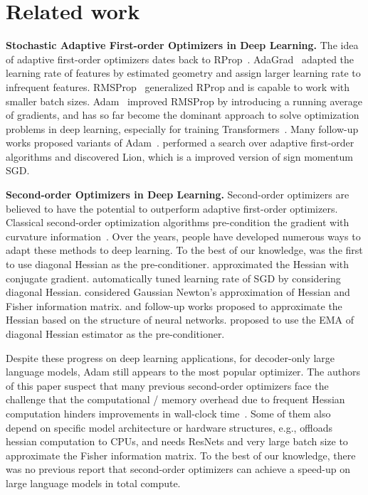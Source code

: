 \section{Related work} 
\label{sec:rw}
\textbf{Stochastic Adaptive First-order Optimizers in Deep Learning.} The idea of adaptive first-order optimizers dates back to RProp~\citep{braun1992rprop}. AdaGrad~\citep{duchi2011adaptive} adapted the learning rate of features by estimated geometry and assign larger learning rate to infrequent features. 
RMSProp~\citep{hinton2012neural} generalized RProp and is capable to work with smaller batch sizes. Adam~\citep{kingma2014Adam} improved RMSProp by introducing a running average of gradients, and has so far become the dominant approach to solve optimization problems in deep learning, especially for training Transformers~\citep{vaswani2017attention}. Many follow-up works proposed variants of Adam~\citep{dozat2016incorporating,shazeer2018adafactor,reddi2019convergence,loshchilov2017decoupled, zhuang2020adabelief, you2019large}. \citet{chen2023symbolic} performed a search over adaptive first-order algorithms and discovered Lion, which is a improved version of sign momentum SGD.


\textbf{Second-order Optimizers in Deep Learning.} Second-order optimizers are believed to have the potential to outperform adaptive first-order optimizers. Classical second-order optimization algorithms pre-condition the gradient with curvature information~\citep{broyden1970convergence,nesterov2006cubic,conn2000trust}. Over the years, people have developed numerous ways to adapt these methods to deep learning. To the best of our knowledge, \citet{becker1988improving} was the first to use diagonal Hessian as the pre-conditioner. \citet{martens2010deep} approximated the Hessian with conjugate gradient. \citet{schaul2013no} automatically tuned learning rate of SGD by considering diagonal Hessian. \citet{pascanu2013revisiting} considered Gaussian Newton's approximation of Hessian and Fisher information matrix. \citet{martens2015optimizing} and follow-up works \citep{ba2017distributed,george2018fast,martens2018kronecker,zhang2022eva} proposed to approximate the Hessian based on the structure of neural networks. \citet{yao2021adahessian, jahani2021doubly} proposed to use the EMA of diagonal Hessian estimator as the pre-conditioner. 

Despite these progress on deep learning applications, for decoder-only large language models, Adam still appears to the most popular optimizer. The authors of this paper suspect that many previous second-order optimizers face the challenge that the computational / memory overhead due to frequent Hessian computation hinders improvements in wall-clock time~\citep{martens2015optimizing,gupta2018shampoo}. Some of them also depend on specific model architecture or hardware structures, e.g., \citet{anil2020scalable} offloads hessian computation to CPUs, and \citet{george2018fast} needs ResNets and very large batch size to approximate the Fisher information matrix. To the best of our knowledge, there was no previous report that second-order optimizers can achieve a speed-up on large language models in total compute.

